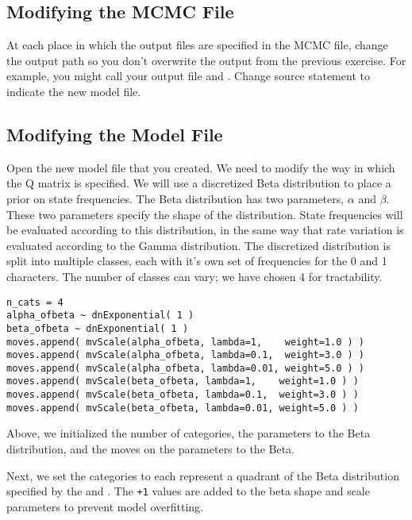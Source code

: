 \subsection{Modifying the MCMC File}

At each place in which the output files are specified in the MCMC file, change the output path so you don't overwrite the output from the previous exercise. 
For example, you might call your output file  and .
Change source statement to indicate the new model file.

\subsection{Modifying the Model File}

Open the new model file that you created. We need to modify the way in which the Q matrix is specified. 
We will use a discretized Beta distribution to place a prior on state frequencies. 
The Beta distribution has two parameters, $\alpha$ and $\beta$.
These two parameters specify the shape of the distribution.
State frequencies will be evaluated according to this distribution, in the same way that rate variation is evaluated according to the Gamma distribution. 
The discretized distribution is split into multiple classes, each with it's own set of frequencies for the 0 and 1 characters.
The number of classes can vary; we have chosen 4 for tractability.\par

{\tt \begin{snugshade*}
\begin{lstlisting}
n_cats = 4
alpha_ofbeta ~ dnExponential( 1 )
beta_ofbeta ~ dnExponential( 1 )
moves.append( mvScale(alpha_ofbeta, lambda=1,    weight=1.0 ) )
moves.append( mvScale(alpha_ofbeta, lambda=0.1,  weight=3.0 ) )
moves.append( mvScale(alpha_ofbeta, lambda=0.01, weight=5.0 ) )
moves.append( mvScale(beta_ofbeta, lambda=1,    weight=1.0 ) )
moves.append( mvScale(beta_ofbeta, lambda=0.1,  weight=3.0 ) )
moves.append( mvScale(beta_ofbeta, lambda=0.01, weight=5.0 ) )
\end{lstlisting}
\end{snugshade*}}

Above, we initialized the number of categories,  the parameters to the Beta distribution, and the moves on the parameters to the Beta. 

Next, we set the categories to each represent a quadrant of the Beta distribution specified by the  and . The {\tt +1} values are added to the beta shape and scale parameters to prevent model overfitting.

